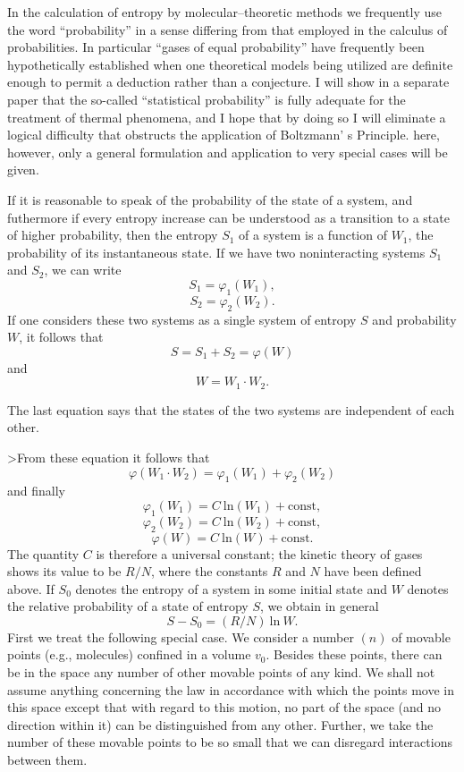 \documentclass[12pt]{article}
\begin{document}
In the calculation of entropy by molecular--theoretic methods we frequently use
the word ``probability'' in a sense differing from that employed in the calculus
of probabilities. In particular ``gases of equal probability'' have frequently
been hypothetically established when one theoretical models being utilized
are definite enough to permit a deduction rather than a conjecture. I will show
in a separate paper that the so-called ``statistical probability'' is fully
adequate for the treatment of thermal phenomena, and I hope that by doing so I
will eliminate a logical difficulty that obstructs the application of Boltzmann'
s Principle. here, however, only a general formulation and application to very
special cases will be given.

If it is reasonable to speak of the probability of the state of a system, and
futhermore if every entropy increase can be understood as a transition to a
state of higher probability, then the entropy $S_1$ of a system is a function of
$W_1$, the probability of its instantaneous state. If we have two 
noninteracting systems $S_1$ and $S_2$, we can write 
$$
S_1 = \varphi_1 (W_1),
$$
$$
S_2 = \varphi_2  (W_2).
$$
If one considers these two systems as a single system of entropy $S$ and
probability $W$, it follows that 
$$
S = S_1 + S_2 = \varphi (W)
$$
and
$$
W = W_1 \cdot W_2.
$$

The last equation says that the states of the two  systems are independent of
each other.

>From these equation it follows that
$$
\varphi (W_1 \cdot W_2) = \varphi_1 (W_1) + \varphi_2 (W_2)
$$
and finally
$$
\varphi_1(W_1) = C ~\mbox{ln} (W_1) + \mbox{const},
$$
$$
\varphi_2(W_2) = C ~ \mbox{ln} (W_2) + \mbox{const},
$$
$$
\varphi (W) = C ~ \mbox{ln} (W) + \mbox{const}.
$$
The quantity $C$ is therefore a universal constant; the kinetic theory of gases
shows its value to be $R/N$, where the constants $R$ and $N$ have been defined
above. If $S_0$ denotes the entropy of a system in some initial state and $W$
denotes the relative probability of a state of entropy $S$, we obtain in general
$$
S - S_0 = (R/N) ~ \mbox{ln}~W.
$$ 
First we treat the following special case. We consider a number $(n)$ of movable
points (e.g., molecules) confined in a volume $v_0$. Besides these points, there
can be in the space any number of other movable points of any kind. We shall not
assume anything concerning the law in accordance with which the points move in
this space except that with regard to this motion, no part of the space (and no
direction within it) can be distinguished from any other. Further, we take the
number of these movable points to be so small that we can disregard interactions
between them.
\end{document}
